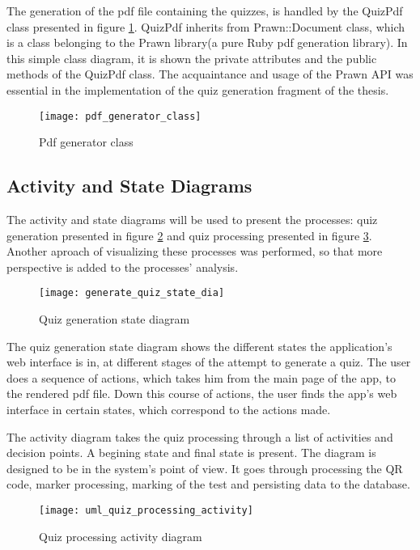 The generation of the pdf file containing the quizzes, is handled by the QuizPdf class presented in figure \ref{pdf_class}. QuizPdf inherits from Prawn::Document class, which is a class belonging to the Prawn library(a pure Ruby pdf generation library). In this simple class diagram, it is shown the private attributes and the public methods of the QuizPdf class. The acquaintance and usage of the Prawn API was essential in the implementation of the quiz generation fragment of the thesis.

\begin{figure}[!ht]
\centering
\texttt{[image: pdf\_generator\_class]}
\caption{Pdf generator class}\label{pdf_class}
\end{figure}

\subsection{Activity and State Diagrams}
The activity and state diagrams will be used to present the processes: quiz generation presented in figure \ref{generation_state} and quiz processing presented in figure \ref{processing_activity}. Another aproach of visualizing these processes was performed, so that more perspective is added to the processes' analysis. 

\begin{figure}[!ht]
\centering
\texttt{[image: generate\_quiz\_state\_dia]}
\caption{Quiz generation state diagram}\label{generation_state}
\end{figure}

The quiz generation state diagram shows the different states the application's web interface is in, at different stages of the attempt to generate a quiz. The user does a sequence of actions, which takes him from the main page of the app, to the rendered pdf file. Down this course of actions, the user finds the app's web interface in certain states, which correspond to the actions made.

The activity diagram takes the quiz processing through a list of activities and decision points. A begining state and final state is present. The diagram is designed to be in the system's point of view. It goes through processing the QR code, marker processing, marking of the test and persisting data to the database.


\begin{figure}[!ht]
\centering
\texttt{[image: uml\_quiz\_processing\_activity]}
\caption{Quiz processing activity diagram}\label{processing_activity}
\end{figure}


